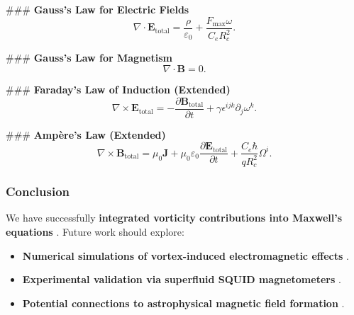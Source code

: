### \textbf{Gauss’s Law for Electric Fields}
\begin{equation}
    \nabla \cdot \mathbf{E}_{\text{total}} = \frac{\rho}{\varepsilon_0} + \frac{F_{\text{max}} \omega}{C_e R_c^2}.
\end{equation}

### \textbf{Gauss’s Law for Magnetism}
\begin{equation}
    \nabla \cdot \mathbf{B} = 0.
\end{equation}

### \textbf{Faraday’s Law of Induction (Extended)}
\begin{equation}
    \nabla \times \mathbf{E}_{\text{total}} = - \frac{\partial \mathbf{B}_{\text{total}}}{\partial t} + \gamma \epsilon^{ijk} \partial_j \omega^k.
\end{equation}

### \textbf{Ampère’s Law (Extended)}
\begin{equation}
    \nabla \times \mathbf{B}_{\text{total}} = \mu_0 \mathbf{J} + \mu_0 \varepsilon_0 \frac{\partial \mathbf{E}_{\text{total}}}{\partial t} + \frac{C_e \hbar}{q R_c^2} \Omega^i.
\end{equation}

\subsubsection*{Conclusion}
We have successfully \textbf{integrated vorticity contributions into Maxwell’s equations} . Future work should explore:
\begin{itemize}
    \item \textbf{Numerical simulations of vortex-induced electromagnetic effects} .
    \item \textbf{Experimental validation via superfluid SQUID magnetometers} .
    \item \textbf{Potential connections to astrophysical magnetic field formation} .
\end{itemize}

